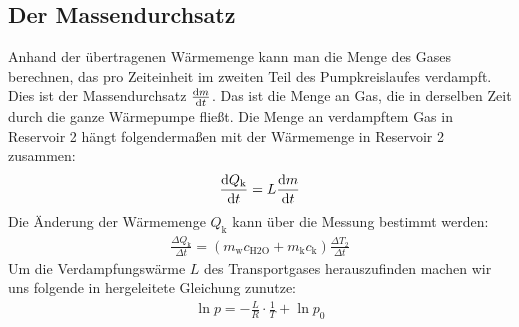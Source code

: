 \subsection{Der Massendurchsatz \cite[vgl.][]{man:v206}}
Anhand der übertragenen Wärmemenge kann man die Menge des Gases berechnen, das pro Zeiteinheit
im zweiten Teil des Pumpkreislaufes verdampft.
Dies ist der Massendurchsatz $\frac{\mathop{}\!\mathrm{d} m}{\mathop{}\!\mathrm{d} t}$.
Das ist die Menge an Gas, die in derselben Zeit durch die ganze Wärmepumpe fließt.
Die Menge an verdampftem Gas in Reservoir 2 hängt folgendermaßen mit der Wärmemenge in Reservoir 2 zusammen:
\begin{align}
    \frac{\mathop{}\!\mathrm{d} Q_\text{k}}{\mathop{}\!\mathrm{d} t} = L \frac{\mathop{}\!\mathrm{d} m}{\mathop{}\!\mathrm{d} t}
    \label{eq:massedurchsatz}
\end{align} 
Die Änderung der Wärmemenge $ Q_\text{k}$ kann über die Messung bestimmt werden:
\begin{align}
    \frac{\Delta Q_\text{k}}{\Delta t} = (m_\text{w} c_{\text{H2O}} + m_\text{k} c_\text{k}) \frac{\Delta T_2}{\Delta t}
    \label{eq:aenderung_q2}
\end{align} 
Um die Verdampfungswärme $L$ des Transportgases herauszufinden machen wir uns folgende in \cite[][5]{man:v203} hergeleitete
Gleichung zunutze:
\begin{align}
    \ln{p} = -\frac{L}{R}\cdot \frac{1}{T} + \ln{p_0}
    \label{eq:Dampfdruckkurve}
\end{align}